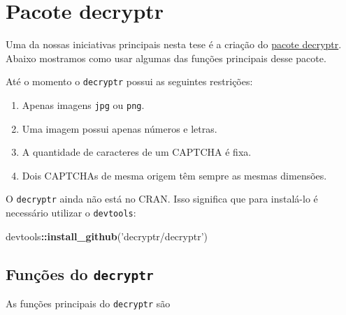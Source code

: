 \documentclass[12pt,]{report}
\newenvironment{Shaded}{\begin{snugshade}}{\end{snugshade}}
\newcommand{\KeywordTok}[1]{\textcolor[rgb]{0.13,0.29,0.53}{\textbf{#1}}}
\newcommand{\NormalTok}[1]{#1}
\newcommand{\OperatorTok}[1]{\textcolor[rgb]{0.81,0.36,0.00}{\textbf{#1}}}
\newcommand{\StringTok}[1]{\textcolor[rgb]{0.31,0.60,0.02}{#1}}
\providecommand{\tightlist}{%
  \setlength{\itemsep}{0pt}\setlength{\parskip}{0pt}}
\begin{document}
\hypertarget{pacote-decryptr}{%
\chapter{Pacote decryptr}\label{pacote-decryptr}}

Uma da nossas iniciativas principais nesta tese é a criação do \href{https://github.com/decryptr/decryptr}{pacote decryptr}. Abaixo mostramos como usar algumas das funções principais desse pacote.

Até o momento o \texttt{decryptr} possui as seguintes restrições:

\begin{enumerate}
\def\labelenumi{\arabic{enumi}.}
\tightlist
\item
  Apenas imagens \texttt{jpg} ou \texttt{png}.
\item
  Uma imagem possui apenas números e letras.
\item
  A quantidade de caracteres de um CAPTCHA é fixa.
\item
  Dois CAPTCHAs de mesma origem têm sempre as mesmas dimensões.
\end{enumerate}

O \texttt{decryptr} ainda não está no CRAN. Isso significa que para instalá-lo é necessário utilizar o \texttt{devtools}:

\begin{Shaded}
\begin{Highlighting}[]
\NormalTok{devtools}\OperatorTok{::}\KeywordTok{install_github}\NormalTok{(}\StringTok{'decryptr/decryptr'}\NormalTok{)}
\end{Highlighting}
\end{Shaded}

\hypertarget{funuxe7uxf5es-do-decryptr}{%
\section{\texorpdfstring{Funções do \texttt{decryptr}}{Funções do decryptr}}\label{funuxe7uxf5es-do-decryptr}}

As funções principais do \texttt{decryptr} são
\end{document}
